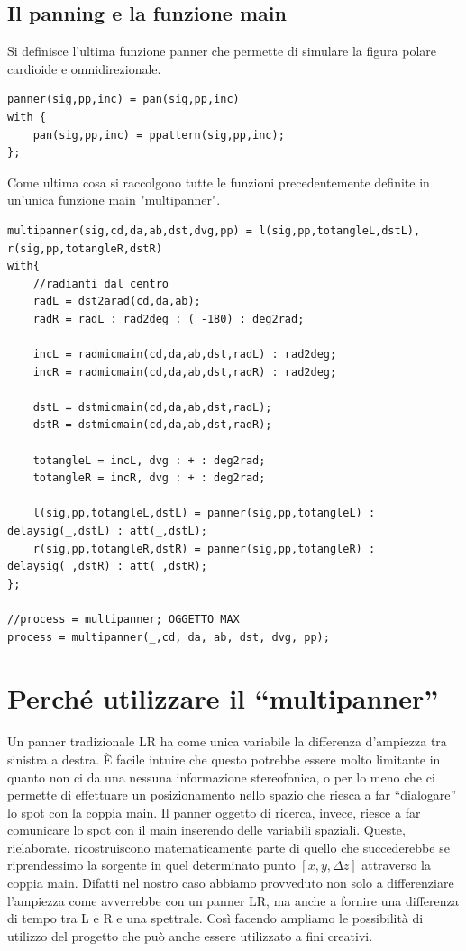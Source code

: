 \documentclass{article}
\begin{document}
\subsection{Il panning e la funzione main}
Si definisce l'ultima funzione panner che permette di simulare la figura polare cardioide e omnidirezionale. 
\begin{lstlisting}
panner(sig,pp,inc) = pan(sig,pp,inc)
with {
    pan(sig,pp,inc) = ppattern(sig,pp,inc); 
};
\end{lstlisting}

Come ultima cosa si raccolgono tutte le funzioni precedentemente definite in un'unica funzione main "multipanner".

\begin{lstlisting}
multipanner(sig,cd,da,ab,dst,dvg,pp) = l(sig,pp,totangleL,dstL), r(sig,pp,totangleR,dstR)
with{
    //radianti dal centro
    radL = dst2arad(cd,da,ab);
    radR = radL : rad2deg : (_-180) : deg2rad;

    incL = radmicmain(cd,da,ab,dst,radL) : rad2deg;
    incR = radmicmain(cd,da,ab,dst,radR) : rad2deg;

    dstL = dstmicmain(cd,da,ab,dst,radL);
    dstR = dstmicmain(cd,da,ab,dst,radR);

    totangleL = incL, dvg : + : deg2rad;
    totangleR = incR, dvg : + : deg2rad;

    l(sig,pp,totangleL,dstL) = panner(sig,pp,totangleL) : delaysig(_,dstL) : att(_,dstL);
    r(sig,pp,totangleR,dstR) = panner(sig,pp,totangleR) : delaysig(_,dstR) : att(_,dstR);
};

//process = multipanner; OGGETTO MAX
process = multipanner(_,cd, da, ab, dst, dvg, pp);
\end{lstlisting}
\section{Perché utilizzare il ``multipanner''}
    
    Un panner tradizionale LR ha come unica variabile la differenza d'ampiezza tra sinistra a destra. È facile intuire che questo potrebbe essere molto limitante in quanto non ci da una nessuna informazione stereofonica, o per lo meno che ci permette di effettuare un posizionamento nello spazio che riesca a far ``dialogare'' lo spot con la coppia main. Il panner oggetto di ricerca, invece, riesce a far comunicare lo spot con il main inserendo delle variabili spaziali. 
    Queste, rielaborate, ricostruiscono matematicamente parte di quello che succederebbe se riprendessimo la sorgente in quel determinato punto $[x, y, \Delta z]$ attraverso la coppia main. 
    Difatti nel nostro caso abbiamo provveduto non solo a differenziare l'ampiezza come avverrebbe con un panner LR, ma anche a fornire una differenza di tempo tra L e R e una spettrale. Così facendo ampliamo le possibilità di utilizzo del progetto che può anche essere utilizzato a fini creativi.
\end{document}
